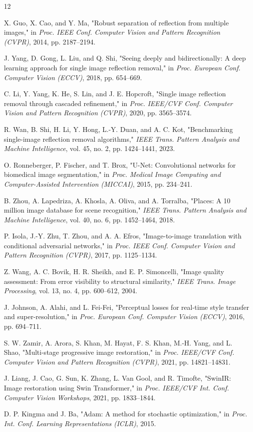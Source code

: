 \documentclass[conference]{IEEEtran}
\begin{document}
\newpage
\begin{thebibliography}{12}

 X. Guo, X. Cao, and Y. Ma, "Robust separation of
reflection from multiple images," in \textit{Proc. IEEE Conf. Computer
Vision and Pattern Recognition (CVPR)}, 2014, pp. 2187--2194.

 J. Yang, D. Gong, L. Liu, and Q. Shi, "Seeing deeply
and bidirectionally: A deep learning approach for single image reflection
removal," in \textit{Proc. European Conf. Computer Vision (ECCV)}, 2018,
pp. 654--669.

 C. Li, Y. Yang, K. He, S. Lin, and J. E. Hopcroft,
"Single image reflection removal through cascaded refinement," in
\textit{Proc. IEEE/CVF Conf. Computer Vision and Pattern Recognition
(CVPR)}, 2020, pp. 3565--3574.

 R. Wan, B. Shi, H. Li, Y. Hong, L.-Y. Duan, and
A. C. Kot, "Benchmarking single-image reflection removal algorithms,"
\textit{IEEE Trans. Pattern Analysis and Machine Intelligence},
vol. 45, no. 2, pp. 1424--1441, 2023.

 O. Ronneberger, P. Fischer, and T. Brox, "U-Net:
Convolutional networks for biomedical image segmentation," in
\textit{Proc. Medical Image Computing and Computer-Assisted Intervention
(MICCAI)}, 2015, pp. 234--241.

 B. Zhou, A. Lapedriza, A. Khosla, A. Oliva, and
A. Torralba, "Places: A 10 million image database for scene
recognition," \textit{IEEE Trans. Pattern Analysis and Machine
Intelligence}, vol. 40, no. 6, pp. 1452--1464, 2018.

 P. Isola, J.-Y. Zhu, T. Zhou, and A. A. Efros,
"Image-to-image translation with conditional adversarial networks,"
in \textit{Proc. IEEE Conf. Computer Vision and Pattern Recognition
(CVPR)}, 2017, pp. 1125--1134.

 Z. Wang, A. C. Bovik, H. R. Sheikh, and
E. P. Simoncelli, "Image quality assessment: From error visibility
to structural similarity," \textit{IEEE Trans. Image Processing},
vol. 13, no. 4, pp. 600--612, 2004.

 J. Johnson, A. Alahi, and L. Fei-Fei,
"Perceptual losses for real-time style transfer and super-resolution,"
in \textit{Proc. European Conf. Computer Vision (ECCV)}, 2016,
pp. 694--711.

 S. W. Zamir, A. Arora, S. Khan, M. Hayat,
F. S. Khan, M.-H. Yang, and L. Shao, "Multi-stage progressive image
restoration," in \textit{Proc. IEEE/CVF Conf. Computer Vision and
Pattern Recognition (CVPR)}, 2021, pp. 14821--14831.

 J. Liang, J. Cao, G. Sun, K. Zhang,
L. Van Gool, and R. Timofte, "SwinIR: Image restoration using Swin
Transformer," in \textit{Proc. IEEE/CVF Int. Conf. Computer Vision
Workshops}, 2021, pp. 1833--1844.

 D. P. Kingma and J. Ba, "Adam: A method for
stochastic optimization," in \textit{Proc. Int. Conf. Learning
Representations (ICLR)}, 2015.

\end{thebibliography}
\end{document}
